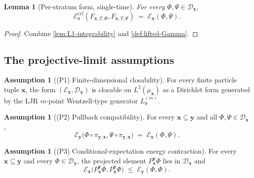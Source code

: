 \documentclass[11pt,reqno]{amsart}
\theoremstyle{plain}
\newtheorem{lemma}[theorem]{Lemma}
\theoremstyle{definition}
\newtheorem{assumption}[theorem]{Assumption}
\theoremstyle{remark}
\newcommand{\cE}{\mathcal E}
\newcommand{\Lth}[1]{L^{(#1)}_{\theta}}
\newcommand{\Ecyl}{\cE_{\theta}^{\mathrm{cyl}}}
\begin{document}
\begin{lemma}[Per-stratum form, single-time]\label{lem:per-stratum}
For every $\Phi,\Psi\in\mathcal D_{\mathbf x}$,
\begin{equation}\label{eq:per-stratum-lift}
  \Ecyl(F_{\mathbf x,T,\Phi},F_{\mathbf x,T,\Psi})
  \;=\;\cE_{\mathbf x}(\Phi,\Psi).
\end{equation}
\end{lemma}

\begin{proof}
Combine \cref{lem:L1-integrability} and \cref{def:lifted-Gamma}.
\end{proof}

\subsection{The projective-limit assumptions}\label{sec:formclos-assumptions}

\begin{assumption}[(P1) Finite-dimensional closability]\label{P1}
For every finite particle tuple $\mathbf x$, the form
$(\cE_{\mathbf x},\mathcal D_{\mathbf x})$ is closable on
$L^{2}(\mu_{\mathbf x})$ as a Dirichlet form generated by the LJR
$m$-point Wentzell-type generator $\Lth{m}$.
\end{assumption}

\begin{assumption}[(P2) Pullback compatibility]\label{P2}
For every $\mathbf x\subseteq\mathbf y$ and all
$\Phi,\Psi\in\mathcal D_{\mathbf x}$,
\begin{equation}\label{eq:P2}
  \cE_{\mathbf y}\bigl(\Phi\circ\pi_{\mathbf y,\mathbf x},
                       \Psi\circ\pi_{\mathbf y,\mathbf x}\bigr)
  \;=\;\cE_{\mathbf x}(\Phi,\Psi).
\end{equation}
\end{assumption}

\begin{assumption}[(P3) Conditional-expectation energy contraction]\label{P3}
For every $\mathbf x\subseteq\mathbf y$ and every
$\Phi\in\mathcal D_{\mathbf y}$, the projected element
$P_{\mathbf x}^{\mathbf y}\Phi$ lies in $\mathcal D_{\mathbf x}$
and
\begin{equation}\label{eq:P3}
  \cE_{\mathbf x}\bigl(P_{\mathbf x}^{\mathbf y}\Phi,
                       P_{\mathbf x}^{\mathbf y}\Phi\bigr)
  \;\le\;\cE_{\mathbf y}(\Phi,\Phi).
\end{equation}
\end{assumption}
\end{document}
